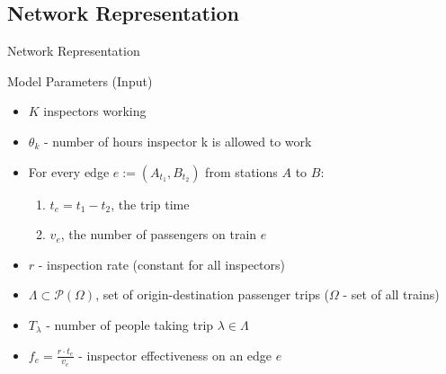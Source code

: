 \documentclass[handout]{beamer}
\begin{document}
\subsection{Network Representation}

\begin{frame}{Network Representation}
\begin{figure}
    \centering
    \begin{subfigure}
        \texttt{[image: graph\_\_.png]}
     \end{subfigure}
\end{figure}
\end{frame}

\begin{frame}{Model Parameters (Input)}
    \begin{itemize}
        \item $K$ inspectors working
        \item $\theta_k$ - number of hours inspector k is allowed to work
        \item For every edge $e := (A_{t_1}, B_{t_2})$ from stations $A$ to $B$:
        \begin{enumerate}
            \item $t_e = t_1 - t_2$, the trip time
            \item $v_e$, the number of passengers on train $e$
        \end{enumerate}
        \item $r$ - inspection rate (constant for all inspectors)
        \item $\Lambda \subset \mathcal{P}(\Omega)$, set of origin-destination passenger trips ($\Omega$ - set of all trains)
        \item $T_{\lambda}$ - number of people taking trip $\lambda \in \Lambda$
        \item $f_e = \frac{r\cdot t_e}{v_e}$ - inspector effectiveness on an edge $e$
    
    \end{itemize}
\end{frame}
\end{document}
